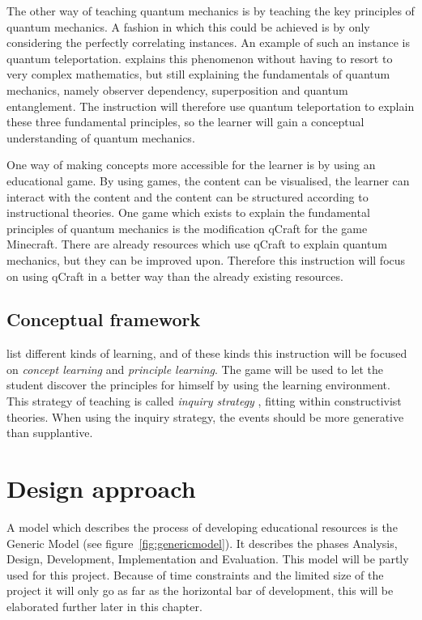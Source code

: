 \documentclass[12pt]{report} %
\begin{document}
The other way of teaching quantum mechanics is by teaching the key principles of quantum mechanics. A fashion in which this could be achieved is by only considering the perfectly correlating instances. An example of such an instance is quantum teleportation.  explains this phenomenon without having to resort to very complex mathematics, but still explaining the fundamentals of quantum mechanics, namely observer dependency, superposition and quantum entanglement. The instruction will therefore use quantum teleportation to explain these three fundamental principles, so the learner will gain a conceptual understanding of quantum mechanics.

One way of making concepts more accessible for the learner is by using an educational game. By using games, the content can be visualised, the learner can interact with the content and the content can be structured according to instructional theories. One game which exists to explain the fundamental principles of quantum mechanics is the modification qCraft for the game Minecraft. There are already resources which use qCraft to explain quantum mechanics, but they can be improved upon. Therefore this instruction will focus on using qCraft in a better way than the already existing resources.

\section{Conceptual framework}

 list different kinds of learning, and of these kinds this instruction will be focused on \emph{concept learning} and \emph{principle learning}. The game will be used to let the student discover the principles for himself by using the learning environment. This strategy of teaching is called \emph{inquiry strategy} \cite{smithragan}, fitting within constructivist theories. When using the inquiry strategy, the events should be more generative than supplantive.

\chapter{Design approach}

A model which describes the process of developing educational resources is the Generic Model \cite{genericmodel} (see figure~\ref{fig:genericmodel}). It describes the phases Analysis, Design, Development, Implementation and Evaluation. This model will be partly used for this project. Because of time constraints and the limited size of the project it will only go as far as the horizontal bar of development, this will be elaborated further later in this chapter.
\end{document}

